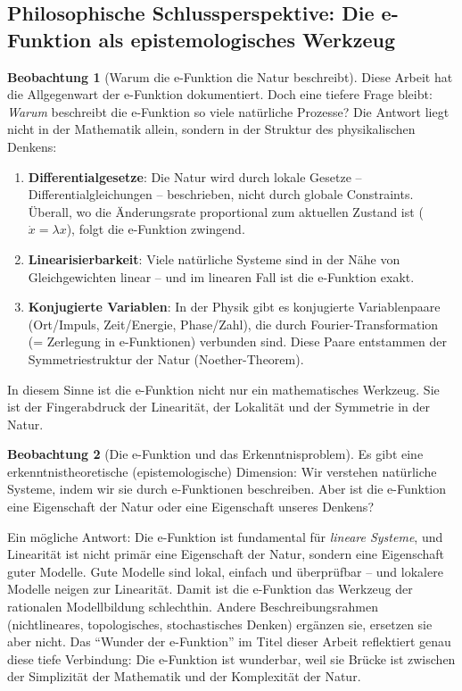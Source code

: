 ﻿\documentclass[a4paper,12pt]{report}
\theoremstyle{definition}
\newtheorem{beobachtung}{Beobachtung}
\begin{document}
	\subsection{Philosophische Schlussperspektive: Die e-Funktion als epistemologisches Werkzeug}
	
	\begin{beobachtung}[Warum die e-Funktion die Natur beschreibt]
		Diese Arbeit hat die Allgegenwart der e-Funktion dokumentiert. Doch eine tiefere Frage bleibt: \emph{Warum} beschreibt die e-Funktion so viele natürliche Prozesse? Die Antwort liegt nicht in der Mathematik allein, sondern in der Struktur des physikalischen Denkens:
		\begin{enumerate}
			\item[-] \textbf{Differentialgesetze}: Die Natur wird durch lokale Gesetze -- Differentialgleichungen -- beschrieben, nicht durch globale Constraints. Überall, wo die Änderungsrate proportional zum aktuellen Zustand ist ($\dot{x} = \lambda x$), folgt die e-Funktion zwingend.
			\item[-] \textbf{Linearisierbarkeit}: Viele natürliche Systeme sind in der Nähe von Gleichgewichten linear -- und im linearen Fall ist die e-Funktion exakt.
			\item[-] \textbf{Konjugierte Variablen}: In der Physik gibt es konjugierte Variablenpaare (Ort/Im\-puls, Zeit/Energie, Phase/Zahl), die durch Fourier-Transformation (= Zerlegung in e-Funktionen) verbunden sind. Diese Paare entstammen der Symmetriestruktur der Natur (Noether-Theorem).
		\end{enumerate}
		In diesem Sinne ist die e-Funktion nicht nur ein mathematisches Werkzeug. Sie ist der Fingerabdruck der Linearität, der Lokalität und der Symmetrie in der Natur.
	\end{beobachtung}
	
	\begin{beobachtung}[Die e-Funktion und das Erkenntnisproblem]
		Es gibt eine erkenntnistheoretische (epistemologische) Dimension: Wir verstehen natürliche Systeme, indem wir sie durch e-Funktionen beschreiben. Aber ist die e-Funktion eine Eigenschaft der Natur oder eine Eigenschaft unseres Denkens?
		
		Ein mögliche Antwort: Die e-Funktion ist fundamental für \emph{lineare Systeme}, und Linearität ist nicht primär eine Eigenschaft der Natur, sondern eine Eigenschaft guter Modelle. Gute Modelle sind lokal, einfach und überprüfbar -- und lokalere Modelle neigen zur Linearität. Damit ist die e-Funktion das Werkzeug der rationalen Modellbildung schlechthin. Andere Beschreibungsrahmen (nichtlineares, topologisches, stochastisches Denken) ergänzen sie, ersetzen sie aber nicht. Das ``Wunder der e-Funktion'' im Titel dieser Arbeit reflektiert genau diese tiefe Verbindung: Die e-Funktion ist wunderbar, weil sie Brücke ist zwischen der Simplizität der Mathematik und der Komplexität der Natur.
	\end{beobachtung}
	
\end{document}
